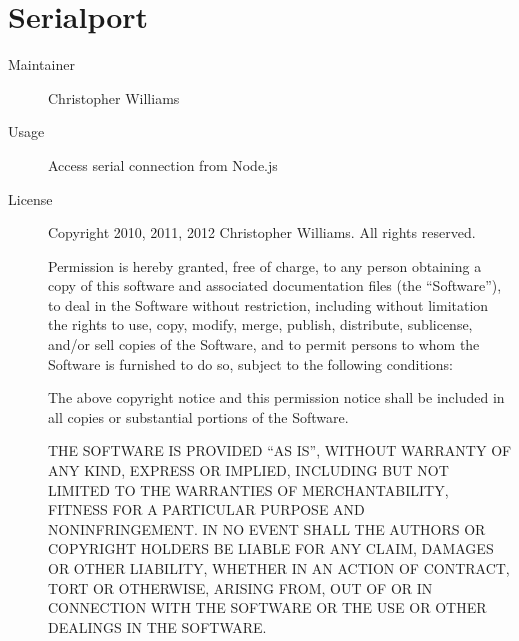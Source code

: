  \section*{Serialport}
    \begin{description}
      \item[Maintainer] Christopher Williams
      \item[Usage] Access serial connection from Node.js
      \item[License] \scriptsize Copyright 2010, 2011, 2012 Christopher Williams. All rights reserved.

      Permission is hereby granted, free of charge, to any person obtaining a copy
      of this software and associated documentation files (the ``Software''), to
      deal in the Software without restriction, including without limitation the
      rights to use, copy, modify, merge, publish, distribute, sublicense, and/or
      sell copies of the Software, and to permit persons to whom the Software is
      furnished to do so, subject to the following conditions:

      The above copyright notice and this permission notice shall be included in
      all copies or substantial portions of the Software.

      THE SOFTWARE IS PROVIDED ``AS IS'', WITHOUT WARRANTY OF ANY KIND, EXPRESS OR
      IMPLIED, INCLUDING BUT NOT LIMITED TO THE WARRANTIES OF MERCHANTABILITY,
      FITNESS FOR A PARTICULAR PURPOSE AND NONINFRINGEMENT. IN NO EVENT SHALL THE
      AUTHORS OR COPYRIGHT HOLDERS BE LIABLE FOR ANY CLAIM, DAMAGES OR OTHER
      LIABILITY, WHETHER IN AN ACTION OF CONTRACT, TORT OR OTHERWISE, ARISING
      FROM, OUT OF OR IN CONNECTION WITH THE SOFTWARE OR THE USE OR OTHER DEALINGS
      IN THE SOFTWARE.
    \end{description}

